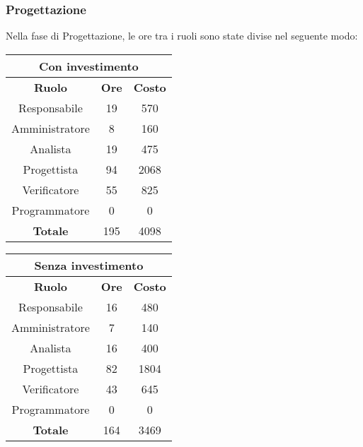 \documentclass{scalatekids-article}
\begin{document}
\subsubsection{Progettazione}
Nella fase di Progettazione, le ore tra i ruoli sono state divise nel seguente modo:
\begin{center}
  \normalsize
  \begin{tabular}{| c | c | c |}
    \hline
    \multicolumn{3}{|c|}{\textbf{Con investimento}}\\
    \hline
    \textbf{Ruolo} & \textbf{Ore} & \textbf{Costo}\\
    \hline
    Responsabile & 19 & 570\\
    Amministratore & 8 & 160\\
    Analista & 19 & 475\\
    Progettista & 94 & 2068\\
    Verificatore & 55 & 825 \\
    Programmatore & 0 & 0 \\
    \hline
    \textbf{Totale} & 195 & 4098\\
    \hline
  \end{tabular}
  \qquad
  \begin{tabular}{| c | c | c |}
    \hline
    \multicolumn{3}{|c|}{\textbf{Senza investimento}}\\
    \hline
    \textbf{Ruolo} & \textbf{Ore} & \textbf{Costo}\\
    \hline
    Responsabile & 16 & 480\\
    Amministratore & 7 & 140\\
    Analista & 16 & 400\\
    Progettista & 82 & 1804\\
    Verificatore & 43 & 645 \\
    Programmatore & 0 & 0 \\
    \hline
    \textbf{Totale} & 164 & 3469\\
    \hline
  \end{tabular}
\end{center}
\end{document}
